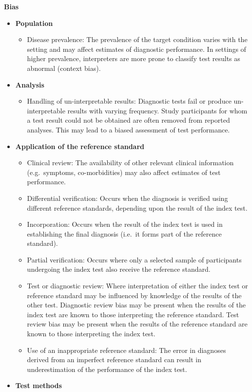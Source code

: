 \documentclass[
  11pt,
  a4paper,
  DIV=11,
  numbers=noendperiod]{scrreprt}
\providecommand{\tightlist}{%
  \setlength{\itemsep}{0pt}\setlength{\parskip}{0pt}}
\begin{document}
\textbf{Bias}

\begin{itemize}
\item
  \textbf{Population}

  \begin{itemize}
  \tightlist
  \item
    Disease prevalence: The prevalence of the target condition varies
    with the setting and may affect estimates of diagnostic performance.
    In settings of higher prevalence, interpreters are more prone to
    classify test results as abnormal (context bias).
  \end{itemize}
\item
  \textbf{Analysis}

  \begin{itemize}
  \tightlist
  \item
    Handling of un-interpretable results: Diagnostic tests fail or
    produce un-interpretable results with varying frequency. Study
    participants for whom a test result could not be obtained are often
    removed from reported analyses. This may lead to a biased assessment
    of test performance.
  \end{itemize}
\item
  \textbf{Application of the reference standard}

  \begin{itemize}
  \item
    Clinical review: The availability of other relevant clinical
    information (e.g.~symptoms, co-morbidities) may also affect
    estimates of test performance.
  \item
    Differential verification: Occurs when the diagnosis is verified
    using different reference standards, depending upon the result of
    the index test.
  \item
    Incorporation: Occurs when the result of the index test is used in
    establishing the final diagnosis (i.e.~it forms part of the
    reference standard).
  \item
    Partial verification: Occurs where only a selected sample of
    participants undergoing the index test also receive the reference
    standard.
  \item
    Test or diagnostic review: Where interpretation of either the index
    test or reference standard may be influenced by knowledge of the
    results of the other test. Diagnostic review bias may be present
    when the results of the index test are known to those interpreting
    the reference standard. Test review bias may be present when the
    results of the reference standard are known to those interpreting
    the index test.
  \item
    Use of an inappropriate reference standard: The error in diagnoses
    derived from an imperfect reference standard can result in
    underestimation of the performance of the index test.
  \end{itemize}
\item
  \textbf{Test methods}


\end{itemize}
\end{document}

